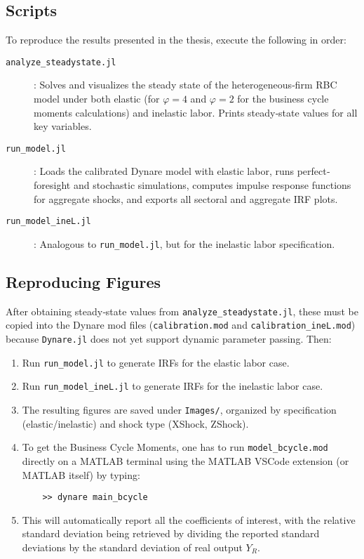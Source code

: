 \documentclass[a4paper,12pt]{article} %
\numberwithin{equation}{section} %
\numberwithin{figure}{section}
\numberwithin{table}{section}
\begin{document}
\begin{refsection}
\begin{appendices}
\subsection{Scripts}

To reproduce the results presented in the thesis, execute the following in order:

\begin{description}
  \item[\texttt{analyze\_steadystate.jl}]: 
    Solves and visualizes the steady state of the heterogeneous‐firm RBC model under both elastic 
    (for $\varphi = 4$ and $\varphi = 2$ for the business cycle moments calculations) and inelastic labor. Prints steady‐state values for all key variables.
  \item[\texttt{run\_model.jl}]: 
    Loads the calibrated Dynare model with elastic labor, runs perfect‐foresight and stochastic simulations, computes impulse response functions for aggregate shocks, and exports all sectoral and aggregate IRF plots.
  \item[\texttt{run\_model\_ineL.jl}]: 
    Analogous to \texttt{run\_model.jl}, but for the inelastic labor specification.
\end{description}

\subsection{Reproducing Figures}

After obtaining steady‐state values from \texttt{analyze\_steadystate.jl}, these must be copied into the Dynare mod files (\texttt{calibration.mod} and \texttt{calibration\_ineL.mod}) because \texttt{Dynare.jl} does not yet support dynamic parameter passing. Then:

\begin{enumerate}
  \item Run \texttt{run\_model.jl} to generate IRFs for the elastic labor case.
  \item Run \texttt{run\_model\_ineL.jl} to generate IRFs for the inelastic labor case.
  \item The resulting figures are saved under \texttt{Images/}, organized by specification 
  (elastic/inelastic) and shock type (XShock, ZShock).
  \item To get the Business Cycle Moments, one has to run \texttt{model\_bcycle.mod} directly on a MATLAB terminal
  using the MATLAB VSCode extension (or MATLAB itself) by typing:
    \begin{verbatim}
    >> dynare main_bcycle
    \end{verbatim}
  \item This will automatically report all the coefficients of interest, with the relative standard deviation being retrieved
  by dividing the reported standard deviations by the standard deviation of real output $Y_R$.
\end{enumerate}



\end{appendices}
\end{refsection}
\end{document}
